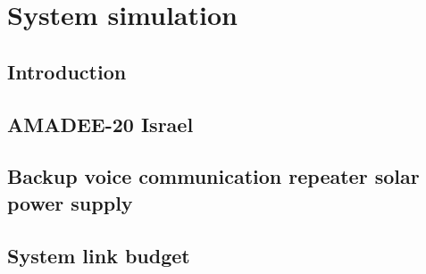 \chapter{System simulation}

\section{Introduction}
\section{AMADEE-20 Israel}
\section{Backup voice communication repeater solar power supply}
\section{System link budget}